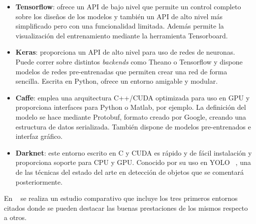 \documentclass{bmvc2k}
\begin{document}
\begin{itemize}
\item \textbf{Tensorflow}: ofrece un API de bajo nivel que permite un control completo sobre los diseños de los modelos y también un API de alto nivel más simplificado pero con una funcionalidad limitada. Además permite la visualización del entrenamiento mediante la herramienta Tensorboard.
\item \textbf{Keras}: proporciona un API de alto nivel para uso de redes de neuronas. Puede correr sobre distintos \textit{backends} como Theano o Tensorflow y dispone modelos de redes pre-entrenadas que permiten crear una red de forma sencilla. Escrita en Python, ofrece un entorno amigable y modular.
\item \textbf{Caffe}: emplea una arquitectura C++/CUDA optimizada para uso en GPU y proporciona interfaces para Python o Matlab, por ejemplo. La definición del modelo se hace mediante Protobuf, formato creado por Google, creando una estructura de datos serializada. También dispone de modelos pre-entrenados e interfaz gráfico.
\item \textbf{Darknet}: este entorno escrito en C y CUDA es rápido y de fácil instalación y proporciona soporte para CPU y GPU. Conocido por su uso en YOLO ~\cite{redmon2016yolo9000}, una de las técnicas del estado del arte en detección de objetos que se comentará posteriormente.
\end{itemize}
En ~\cite{kovalev2016deep} se realiza un estudio comparativo que incluye los tres primeros entornos citados donde se pueden destacar las buenas prestaciones de los mismos respecto a otros.
\end{document}
